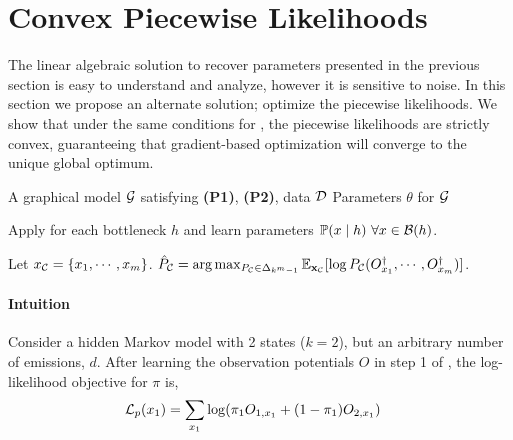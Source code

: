 \section{Convex Piecewise Likelihoods}
\label{sec:piecewise}

The linear algebraic solution to recover parameters presented in the
  previous section is easy to understand and analyze, however it is
  sensitive to noise. 
In this section we propose an alternate solution; optimize the piecewise
  likelihoods.
We show that under the same conditions for , the
  piecewise likelihoods are strictly convex, guaranteeing that
  gradient-based optimization will converge to the unique global
  optimum.

\begin{algorithm}
  \caption{\LearnPiecewise}
  \label{algo:piecewise}
  \begin{algorithmic}
    \REQUIRE A graphical model $\mathcal{G}$ satisfying \textbf{(P1)}, \textbf{(P2)}, data $\mathcal{D}$
    \ENSURE Parameters $\theta$ for $\mathcal{G}$

        \STATE Apply \TensorFactorize for each bottleneck $h$ and learn parameters $\mathbb{P}(x \mid h) ~ \forall x \in \mathcal{B}(h)$.

      \ENDFOR
      \STATE Let $x_{\mathcal{C}} = \{x_1, \cdots, x_m\}$.
      \STATE $\hat P_{\mathcal{C}} = \arg\max_{P_{\mathcal{C}} \in \Delta_{k^m-1}} \mathbb{E}_{\mathbf{x}_{\mathcal{C}}}[ \log P_{\mathcal{C}}( {O}^{\dagger}_{x_1}, \cdots, {O}^{\dagger}_{x_m} ) ]$.
      \ENDFOR
  \end{algorithmic}
\end{algorithm}


\paragraph{Intuition}

Consider a hidden Markov model  with
  2 states ($k=2$), but an arbitrary number of emissions, $d$. 
After learning the observation potentials $O$ in step 1 of
  , the log-likelihood objective for $\pi$ is,
\begin{align}
  \sL_p(x_1) &= \sum_{x_1} \log( \pi_1 O_{1,x_1} + (1-\pi_1) O_{2,x_1} )

\end{align}


